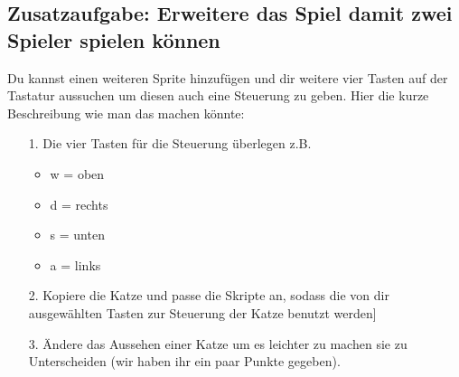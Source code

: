 \subsection{Zusatzaufgabe: Erweitere das Spiel damit zwei Spieler spielen können}
Du kannst einen weiteren Sprite hinzufügen und dir weitere vier Tasten auf der Tastatur aussuchen um diesen auch eine Steuerung zu geben. Hier die kurze Beschreibung wie man das machen könnte:
\begin{itemize}
\item[1. ] Die vier Tasten für die Steuerung überlegen z.B.
  \begin{itemize}
  \item w = oben
  \item d = rechts
  \item s = unten
  \item a = links
\end{itemize}
\item[2. ] Kopiere die Katze und passe die Skripte an, sodass die von dir ausgewählten Tasten zur Steuerung der Katze benutzt werden]
  \item[3. ] Ändere das Aussehen einer Katze um es leichter zu machen sie zu Unterscheiden (wir haben ihr ein paar Punkte gegeben).
\end{itemize}

